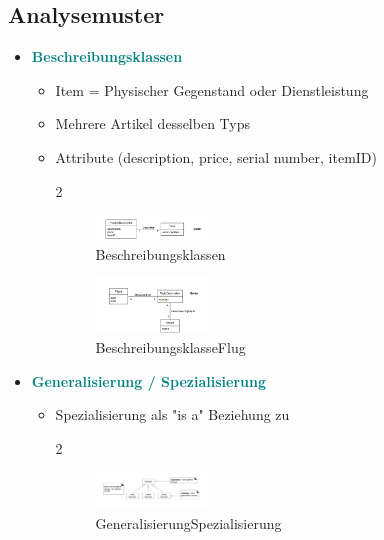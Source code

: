 \documentclass{article}
\begin{document}
\subsection{Analysemuster}
\begin{itemize}
	\item \textcolor {teal} {\textbf{Beschreibungsklassen}}
	\begin{itemize}
		\item Item = Physischer Gegenstand oder Dienstleistung
		\item Mehrere Artikel desselben Typs
		\item Attribute (description, price, serial number, itemID)
			\begin{multicols} {2} \begin{figure}[H]
				\centering
				\includegraphics[width=0.3\textwidth] {Resources/Images/Beschreibungsklassen.png}
			\caption{\label{fig:Beschreibungsklassen}Beschreibungsklassen}
	\end{figure} 
	\columnbreak 
	\begin{figure}[H]
	\centering
	\includegraphics[width=0.3\textwidth] {Resources/Images/BeschreibungsklasseFlug.png}
	\caption{\label{fig:BeschreibungsklasseFlug}BeschreibungsklasseFlug}
	\end{figure} 
			\end{multicols}
	\end{itemize}
	\item \textcolor {teal} {\textbf{ Generalisierung / Spezialisierung}}
	\begin{itemize}
		\item Spezialisierung als "is a" Beziehung zu 
					\begin{multicols} {2} \begin{figure}[H]
				\centering
				\includegraphics[width=0.3\textwidth] {Resources/Images/GeneralisierungSpezialisierung.png}
			\caption{\label{fig:GeneralisierungSpezialisierung}GeneralisierungSpezialisierung}

\end{figure}
\end{multicols}
\end{itemize}
\end{itemize}
\end{document}
